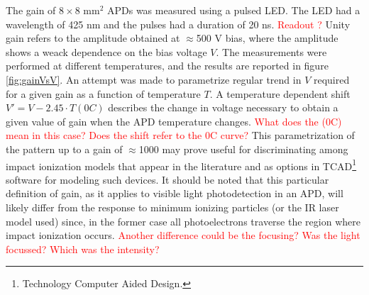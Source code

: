 \documentclass{article}
\begin{document}
The gain of $8 \times 8$ mm$^2$ APDs was measured using a pulsed LED.
The LED had a wavelength of 425 nm and the pulses had a duration of 20 ns.
\textcolor{red}{Readout ?}
Unity gain refers to the amplitude obtained at $\approx$500 V bias, where the amplitude shows a weack dependence on the bias voltage $V$. 
The measurements were performed at different temperatures, and the results are reported in figure\,\ref{fig:gainVsV}.
An attempt was made to parametrize regular trend in $V$ required for a given gain as a function of temperature $T$.
A temperature dependent shift $V' = V -2.45 \cdot T( 0 C)$ describes the change in voltage necessary to obtain a given value of gain when the APD temperature changes.
\textcolor{red}{What does the (0C) mean in this case? Does the shift refer to the 0C curve?}
This parametrization of the pattern up to a gain of $\approx$1000 may prove useful for discriminating among impact ionization models that appear in the literature and as options in TCAD\footnote{Technology Computer Aided Design.} software for modeling such devices.
It should be noted that this particular definition of gain, as it applies to visible light photodetection in an APD, will likely differ from the response to minimum ionizing particles (or the IR laser model used) since, in the former case all photoelectrons traverse the region where impact ionization occurs.
\textcolor{red}{Another difference could be the focusing? Was the light focussed? Which was the intensity?}
\end{document}
